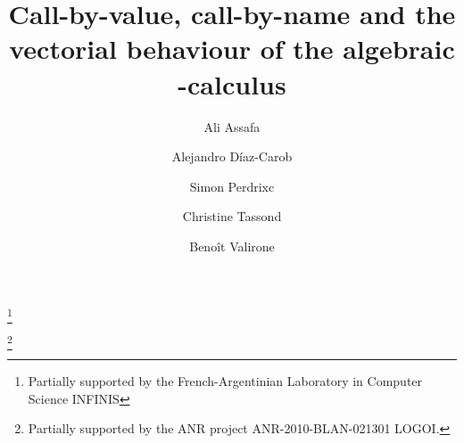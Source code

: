 \documentclass{LMCS}
\begin{document}
\title[CbV, CbN and the vectorial behaviour of the algebraic -calculus]{Call-by-value, call-by-name and the vectorial behaviour of the algebraic -calculus}

\author[A.~Assaf]{Ali Assaf\rsuper a}
\address{{}\'Ecole Polytechnique\\
Route de Saclay\\
91120 Palaiseau\\
France}
\address{{}INRIA\\
23 avenue d'Italie\\
CS 81321\\
75214 Paris Cedex 13\\
France}

\author[A.~D\'iaz-Caro]{Alejandro D\'iaz-Caro\rsuper b}
\address{{\lsuper b}Universidad Nacional de Quilmes\\
Roque S\'aenz Pe\~na 352\\
1876 Bernal, Buenos Aires\\
Argentina}
\thanks{ Partially supported by the French-Argentinian Laboratory in Computer Science INFINIS}

\author[S.~Perdrix]{Simon Perdrix\rsuper c}
\address{{\lsuper c}CNRS \& LORIA\\
615, rue du Jardin Botanique\\
BP-101\\
54602 Villers-l\`es-Nancy\\
France}

\author[C.~Tasson]{Christine Tasson\rsuper d}
\address{{}PPS, Universit\'e Paris-Diderot -- Paris 7\\
CNRS UMR 7126\\
75205 Paris Cedex 13\\
France}

\author[B.~Valiron]{Beno\^it Valiron\rsuper e}
\address{{} I2M, Universit\'{e} Aix-Marseille,\\
CNRS UMR 7373, 
Campus de Luminy, case 907, F–13288 Marseille\\
France}
\thanks{{} Partially supported by the ANR project ANR-2010-BLAN-021301 LOGOI.}

\end{document}
